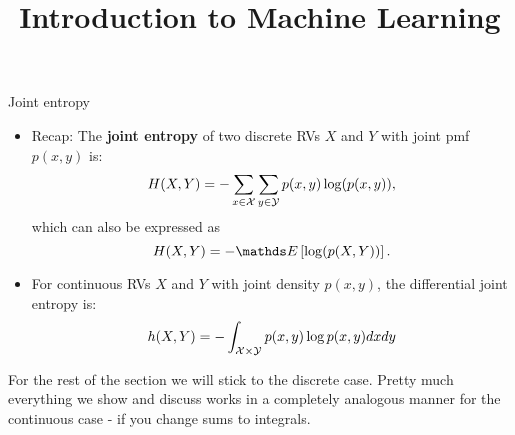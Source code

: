 \documentclass[11pt,compress,t,notes=noshow, xcolor=table]{beamer}
\title{Introduction to Machine Learning}
\date{}
\begin{document}


\begin{vbframe}{Joint entropy}
\begin{itemize}
  \item Recap: The \textbf{joint entropy} of two discrete RVs $X$ and $Y$ with joint pmf $p(x, y)$ is:
  $$ H(X,Y) = -\sum_{x \in \mathcal{X}} \sum_{y \in \mathcal{Y}}  p(x,y) \log(p(x,y)),$$ 
  which can also be expressed as $$ H(X,Y) = -\E \left[ \log(p(X,Y)) \right].$$
  \item For continuous RVs $X$ and $Y$ with joint density $p(x,y)$, the differential joint entropy is:\\
  $$ h(X,Y) = - \int_{\mathcal{X} \times \mathcal{Y}} p(x,y) \log p(x,y) dx dy$$
\end{itemize}

\begin{footnotesize}
For the rest of the section we will stick to the discrete case. Pretty much everything we show and discuss works in a completely analogous manner for the continuous case - if you change sums to integrals.
\end{footnotesize}

\end{vbframe}
\end{document}
